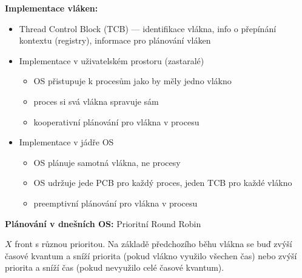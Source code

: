 \textbf{Implementace vláken:}
\begin{itemize}
	\item Thread Control Block (TCB) --- identifikace vlákna, info o přepínání kontextu (registry), informace pro plánování vláken
	\item Implementace v uživatelském prostoru (zastaralé)
	\begin{itemize}
		\item OS přistupuje k procesům jako by měly jedno vlákno
		\item proces si svá vlákna spravuje sám
		\item kooperativní plánování pro vlákna v procesu
	\end{itemize}
	\item Implementace v jádře OS
	\begin{itemize}
		\item OS plánuje samotná vlákna, ne procesy
		\item OS udržuje jede PCB pro každý proces, jeden TCB pro každé vlákno
		\item preemptivní plánování pro vlákna v procesu
	\end{itemize}
\end{itemize}

\textbf{Plánování v dnešních OS:} Prioritní Round Robin

$X$ front s různou prioritou. Na základě předchozího běhu vlákna se buď zvýší časové kvantum a sníží priorita (pokud vlákno využilo všechen čas) nebo zvýší priorita a sníží čas (pokud nevyužilo celé časové kvantum).